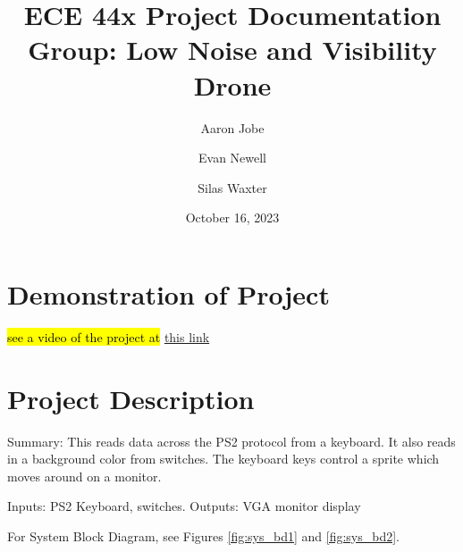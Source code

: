 \documentclass[a4paper]{article}
\title{ECE 44x Project Documentation \\
\large Group: Low Noise and Visibility Drone }
\author{\vspace{2cm} Aaron Jobe \and Evan Newell \and Silas Waxter}
\date{ October 16, 2023}
\begin{document}

\maketitle
\newpage
\tableofcontents
\newpage

\section{Demonstration of Project}
\hl{see a video of the project at }\href{https://vimeo.com/717762161}{this link}

\section{Project Description}
Summary: This reads data across the PS2 protocol from a keyboard.  It also reads in a background color from switches.  The keyboard keys control a sprite which moves around on a monitor.

Inputs:     PS2 Keyboard, switches.
Outputs:    VGA monitor display

For System Block Diagram, see Figures \ref{fig:sys_bd1} and \ref{fig:sys_bd2}. 
\end{document}
